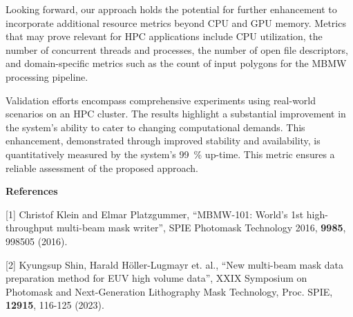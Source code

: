 \documentclass[a4paper, 11pt]{article}
\begin{document}
Looking forward, our approach holds the potential for further enhancement to incorporate additional resource metrics beyond CPU and GPU memory. 
Metrics that may prove relevant for HPC applications include CPU utilization, the number of concurrent threads and processes, the number of open file descriptors, and domain-specific metrics such as the count of input polygons for the MBMW processing pipeline.

Validation efforts encompass comprehensive experiments using real-world scenarios on an HPC cluster.
The results highlight a substantial improvement in the system's ability to cater to changing computational demands.
This enhancement, demonstrated through improved stability and availability, is quantitatively measured by the system's 99~\% up-time.
This metric ensures a reliable assessment of the proposed approach.

\vspace{4ex}
{\bf{References}}
\begin{reflist}
  \item [{[1]}] 
  Christof Klein and Elmar Platzgummer,
  ``MBMW-101: World’s 1st high-throughput multi-beam mask writer'',
  SPIE Photomask Technology 2016,
  \textbf{9985}, 998505
  (2016).

  \item [{[2]}]
  Kyungsup Shin, Harald Höller-Lugmayr et. al.,
  ``New multi-beam mask data preparation method for EUV high volume data'',
  XXIX Symposium on Photomask and Next-Generation Lithography Mask Technology, Proc. SPIE,
  \textbf{12915}, 116-125
  (2023).
\end{reflist}
\end{document}
